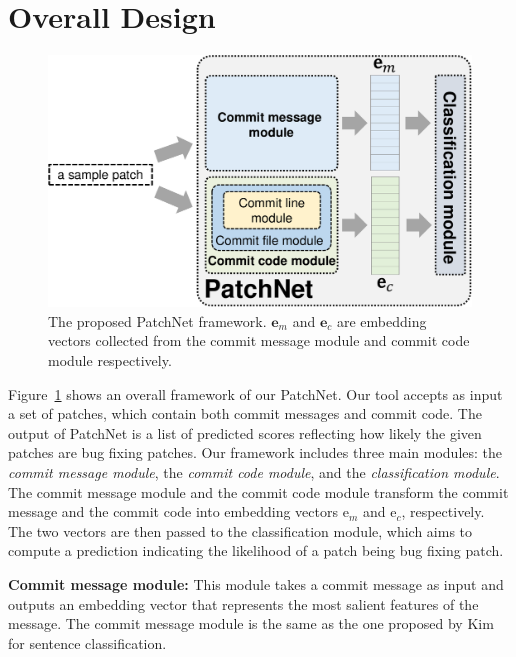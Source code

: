 \section{Overall Design}
\label{sec:design}

\begin{figure}[!t]
	\center
	\includegraphics[scale=0.38]{figures/overall_patchnet.pdf}
	\caption{The proposed PatchNet framework. $\textbf{e}_m$ and $\textbf{e}_c$ are embedding vectors collected from the commit message module and commit code module respectively.}
	\label{fig:patchnet}
    \vspace{-0.4cm}
\end{figure}

Figure~\ref{fig:patchnet} shows an overall framework of our PatchNet. Our tool accepts as input a set of patches, which contain both commit messages and commit code. The output of PatchNet is a list of predicted scores reflecting how likely the given patches are bug fixing patches. Our framework includes three main modules: the \textit{commit message module}, the \textit{commit code module}, and the \textit{classification module}. The commit message module and the commit code module transform the commit message and the commit code into embedding vectors $\text{e}_m$ and $\text{e}_c$, respectively. The two vectors are then passed to the classification module, which aims to compute a prediction indicating the likelihood of a patch being bug fixing patch. 

\noindent \textbf{Commit message module:} This module takes a commit message as input and outputs an embedding vector that represents the most salient features of the message. The commit message module is the same as the one proposed by Kim~\cite{kim2014convolutional} for sentence classification. 